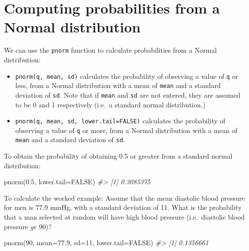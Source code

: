 \documentclass[
]{memoir}
\newenvironment{Shaded}{\begin{snugshade}}{\end{snugshade}}
\newcommand{\AttributeTok}[1]{\textcolor[rgb]{0.77,0.63,0.00}{#1}}
\newcommand{\CommentTok}[1]{\textcolor[rgb]{0.56,0.35,0.01}{\textit{#1}}}
\newcommand{\ConstantTok}[1]{\textcolor[rgb]{0.00,0.00,0.00}{#1}}
\newcommand{\DecValTok}[1]{\textcolor[rgb]{0.00,0.00,0.81}{#1}}
\newcommand{\FloatTok}[1]{\textcolor[rgb]{0.00,0.00,0.81}{#1}}
\newcommand{\FunctionTok}[1]{\textcolor[rgb]{0.00,0.00,0.00}{#1}}
\newcommand{\NormalTok}[1]{#1}
\providecommand{\tightlist}{%
  \setlength{\itemsep}{0pt}\setlength{\parskip}{0pt}}
\begin{document}
\hypertarget{computing-probabilities-from-a-normal-distribution}{%
\section{Computing probabilities from a Normal distribution}\label{computing-probabilities-from-a-normal-distribution}}

We can use the \texttt{pnorm} function to calculate probabilities from a Normal distribution:

\begin{itemize}
\tightlist
\item
  \texttt{pnorm(q,\ mean,\ sd)} calculates the probability of observing a value of \texttt{q} or less, from a Normal distribution with a mean of \texttt{mean} and a standard deviation of \texttt{sd}. Note that if \texttt{mean} and \texttt{sd} are not entered, they are assumed to be 0 and 1 respectively (i.e.~a standard normal distribution.)
\item
  \texttt{pnorm(q,\ mean,\ sd,\ lower.tail=FALSE)} calculates the probability of observing a value of \texttt{q} or more, from a Normal distribution with a mean of \texttt{mean} and a standard deviation of \texttt{sd}.
\end{itemize}

To obtain the probability of obtaining 0.5 or greater from a standard normal distribution:

\begin{Shaded}
\begin{Highlighting}[]
\FunctionTok{pnorm}\NormalTok{(}\FloatTok{0.5}\NormalTok{, }\AttributeTok{lower.tail=}\ConstantTok{FALSE}\NormalTok{)}
\CommentTok{\#\textgreater{} [1] 0.3085375}
\end{Highlighting}
\end{Shaded}

To calculate the worked example: Assume that the mean diastolic blood pressure for men is 77.9 mmHg, with a standard deviation of 11. What is the probability that a man selected at random will have high blood pressure (i.e.~diastolic blood pressure \(ge\) 90)?

\begin{Shaded}
\begin{Highlighting}[]
\FunctionTok{pnorm}\NormalTok{(}\DecValTok{90}\NormalTok{, }\AttributeTok{mean=}\FloatTok{77.9}\NormalTok{, }\AttributeTok{sd=}\DecValTok{11}\NormalTok{, }\AttributeTok{lower.tail=}\ConstantTok{FALSE}\NormalTok{)}
\CommentTok{\#\textgreater{} [1] 0.1356661}
\end{Highlighting}
\end{Shaded}
\end{document}
